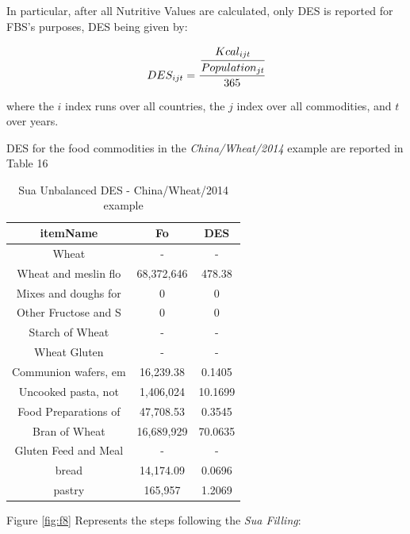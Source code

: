 \documentclass[]{article}
\begin{document}
In particular, after all Nutritive Values are calculated, only DES is
reported for FBS's purposes, DES being given by:

\begin{equation}
\label{eq:des}
 DES_{ijt} = \cfrac{\cfrac{Kcal_{ijt}}{Population_{jt}}}{365}
\end{equation}

where the \(i\) index runs over all countries, the \(j\) index over all
commodities, and \(t\) over years.

DES for the food commodities in the \emph{China/Wheat/2014} example are
reported in Table 16

\begin{table}

\caption{\label{tab:t19}Sua Unbalanced DES - China/Wheat/2014 example}
\centering
\begin{tabular}[t]{c|c|c}
\hline
itemName & Fo & DES\\
\hline
Wheat & - & -\\
\hline
Wheat and meslin flo & 68,372,646 & 478.38\\
\hline
Mixes and doughs for & 0 & 0\\
\hline
Other Fructose and S & 0 & 0\\
\hline
Starch of Wheat & - & -\\
\hline
Wheat Gluten & - & -\\
\hline
Communion wafers, em & 16,239.38 & 0.1405\\
\hline
Uncooked pasta, not & 1,406,024 & 10.1699\\
\hline
Food Preparations of & 47,708.53 & 0.3545\\
\hline
Bran of Wheat & 16,689,929 & 70.0635\\
\hline
Gluten Feed and Meal & - & -\\
\hline
bread & 14,174.09 & 0.0696\\
\hline
pastry & 165,957 & 1.2069\\
\hline
\end{tabular}
\end{table}

Figure \ref{fig:f8} Represents the steps following the \emph{Sua
Filling}:
\end{document}
